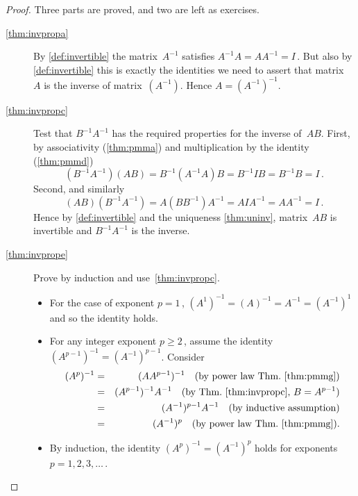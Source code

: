 \begin{proof} 
Three parts are proved, and two are left as exercises.
\begin{description}
\item[\ref{thm:invpropa}]
By \autoref{def:invertible} the matrix~\(A^{-1}\) satisfies \(A^{-1}A=AA^{-1}=I\)\,.
But also by \autoref{def:invertible} this is exactly the identities we need to assert that matrix~\(A\) is the inverse of matrix~\((A^{-1})\).
Hence \(A=(A^{-1})^{-1}\).

\item[\ref{thm:invpropc}]
Test that \(B^{-1}A^{-1}\) has the required properties for the inverse of~\(AB\).
First, by associativity (\autoref{thm:pmma}) and multiplication by the identity (\autoref{thm:pmmd})
\begin{equation*}
(B^{-1}A^{-1})(AB)
=B^{-1}(A^{-1}A)B
=B^{-1}IB
=B^{-1}B
=I\,.
\end{equation*}
Second, and similarly
\begin{equation*}
(AB)(B^{-1}A^{-1})
=A(BB^{-1})A^{-1}
=AIA^{-1}
=AA^{-1}
=I\,.
\end{equation*}
Hence by \autoref{def:invertible} and the uniqueness \autoref{thm:uninv}, matrix~\(AB\) is invertible and \(B^{-1}A^{-1}\) is the inverse.

\item[\ref{thm:invprope}]
Prove by induction and use~\ref{thm:invpropc}.
\begin{itemize}
\item For the case of exponent \(p=1\)\,, \((A^1)^{-1}=(A)^{-1}=A^{-1}=(A^{-1})^1\) and so the identity holds.
\item For any integer exponent \(p\geq2\)\,, assume the identity \((A^{p-1})^{-1}=(A^{-1})^{p-1}\).
Consider 
\begin{eqnarray*}
(A^p)^{-1}&=&(AA^{p-1})^{-1}\quad(\text{by power law Thm.~\ref{thm:pmmg}})
\\&=&(A^{p-1})^{-1}A^{-1}\quad(\text{by Thm.~\ref{thm:invpropc}, }B=A^{p-1})
\\&=&(A^{-1})^{p-1}A^{-1}\quad(\text{by inductive assumption})
\\&=&(A^{-1})^p \quad(\text{by power law Thm.~\ref{thm:pmmg}}).
\end{eqnarray*}
\item By induction, the identity \((A^{p})^{-1}=(A^{-1})^{p}\) holds for exponents \(p=1,2,3,\ldots\)\,.
\end{itemize}
 
\end{description}
\end{proof}




